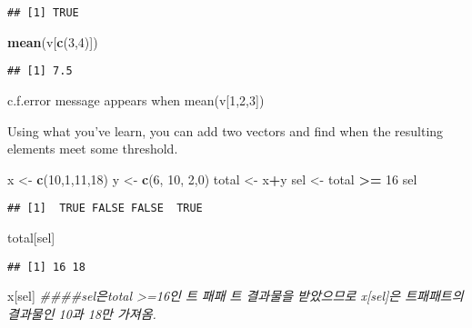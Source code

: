 \documentclass[
]{article}
\newenvironment{Shaded}{\begin{snugshade}}{\end{snugshade}}
\newcommand{\CommentTok}[1]{\textcolor[rgb]{0.56,0.35,0.01}{\textit{#1}}}
\newcommand{\DecValTok}[1]{\textcolor[rgb]{0.00,0.00,0.81}{#1}}
\newcommand{\KeywordTok}[1]{\textcolor[rgb]{0.13,0.29,0.53}{\textbf{#1}}}
\newcommand{\NormalTok}[1]{#1}
\newcommand{\OperatorTok}[1]{\textcolor[rgb]{0.81,0.36,0.00}{\textbf{#1}}}
\newcommand{\StringTok}[1]{\textcolor[rgb]{0.31,0.60,0.02}{#1}}
\begin{document}
\begin{verbatim}
## [1] TRUE
\end{verbatim}

\begin{Shaded}
\begin{Highlighting}[]
\KeywordTok{mean}\NormalTok{(v[}\KeywordTok{c}\NormalTok{(}\DecValTok{3}\NormalTok{,}\DecValTok{4}\NormalTok{)])}
\end{Highlighting}
\end{Shaded}

\begin{verbatim}
## [1] 7.5
\end{verbatim}

c.f.error message appears when mean(v{[}1,2,3{]})

Using what you've learn, you can add two vectors and find when the
resulting elements meet some threshold.

\begin{Shaded}
\begin{Highlighting}[]
\NormalTok{x <-}\StringTok{ }\KeywordTok{c}\NormalTok{(}\DecValTok{10}\NormalTok{,}\DecValTok{1}\NormalTok{,}\DecValTok{11}\NormalTok{,}\DecValTok{18}\NormalTok{)}
\NormalTok{y <-}\StringTok{ }\KeywordTok{c}\NormalTok{(}\DecValTok{6}\NormalTok{, }\DecValTok{10}\NormalTok{, }\DecValTok{2}\NormalTok{,}\DecValTok{0}\NormalTok{)}
\NormalTok{total <-}\StringTok{ }\NormalTok{x}\OperatorTok{+}\NormalTok{y}
\NormalTok{sel <-}\StringTok{ }\NormalTok{total }\OperatorTok{>=}\StringTok{ }\DecValTok{16}
\NormalTok{sel}
\end{Highlighting}
\end{Shaded}

\begin{verbatim}
## [1]  TRUE FALSE FALSE  TRUE
\end{verbatim}

\begin{Shaded}
\begin{Highlighting}[]
\NormalTok{total[sel]}
\end{Highlighting}
\end{Shaded}

\begin{verbatim}
## [1] 16 18
\end{verbatim}

\begin{Shaded}
\begin{Highlighting}[]
\NormalTok{x[sel] }\CommentTok{####sel은total >=16인 트 패패 트 결과물을 받았으므로 x[sel]은 트패패트의 결과물인 10과 18만 가져옴.}
\end{Highlighting}
\end{Shaded}
\end{document}

